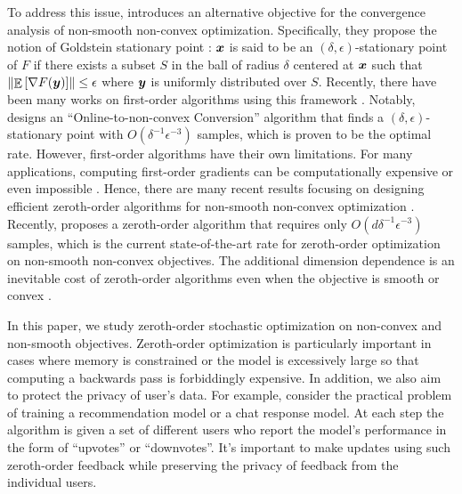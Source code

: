 To address this issue, \cite{zhang2020complexity} introduces an alternative objective for the convergence analysis of non-smooth non-convex optimization. Specifically, they propose the notion of Goldstein stationary point \citep{goldstein1977optimization}: ${\boldsymbol{x}}$ is said to be an $(\delta,\epsilon)$-stationary point of $F$ if there exists a subset $S$ in the ball of radius $\delta$ centered at ${\boldsymbol{x}}$ such that $\left\|\mathop{\mathbb{E}}\left[\nabla F({\boldsymbol{y}})\right]\right\| \le \epsilon$ where ${\boldsymbol{y}}$ is uniformly distributed over $S$.
Recently, there have been many works on first-order algorithms using this framework \citep{zhang2020complexity, tian2022finite, cutkosky2023optimal}. Notably, \cite{cutkosky2023optimal} designs an ``Online-to-non-convex Conversion'' algorithm that finds a $(\delta,\epsilon)$-stationary point with $O(\delta^{-1}\epsilon^{-3})$ samples, which is proven to be the optimal rate.
However, first-order algorithms have their own limitations. 
For many applications, computing first-order gradients can be computationally expensive or even impossible \citep{nelson2010optimization,mania2018simple}.
Hence, there are many recent results focusing on designing efficient zeroth-order algorithms for non-smooth non-convex optimization \citep{lin2022gradient, chen2023faster, kornowski2023algorithm}. Recently, \cite{kornowski2023algorithm} proposes a zeroth-order algorithm that requires only $O(d\delta^{-1}\epsilon^{-3})$ samples, which is the current state-of-the-art rate for zeroth-order optimization on non-smooth non-convex objectives. The additional dimension dependence is an inevitable cost of zeroth-order algorithms even when the objective is smooth or convex \citep{duchi2015optimal}.


In this paper, we study zeroth-order stochastic optimization on non-convex and non-smooth objectives. Zeroth-order optimization is particularly important in cases where memory is constrained or the model is excessively large so that computing a backwards pass is forbiddingly expensive.
In addition, we also aim to protect the privacy of user's data. For example, consider the practical problem of training a recommendation model or a chat response model. At each step the algorithm is given a set of different users who report the model's performance in the form of ``upvotes'' or ``downvotes''. It's important to make updates using such zeroth-order feedback while preserving the privacy of feedback from the individual users.

